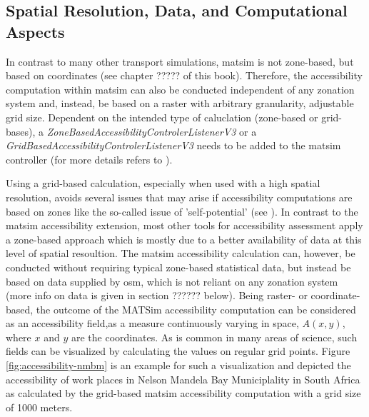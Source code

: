 

\subsection{Spatial Resolution, Data, and Computational Aspects}
In contrast to many other transport simulations, \gls{matsim} is not zone-based, but based on coordinates (see 
chapter ????? of this book).
Therefore, the accessibility computation within \gls{matsim} can also be conducted independent 
of any zonation system and, instead, be based on a raster with arbitrary granularity, \ie adjustable grid
size. Dependent on the intended type of caluclation (zone-based or grid-bases), a 
\textit{ZoneBasedAccessibilityControlerListenerV3} or a \textit{GridBasedAccessibilityControlerListenerV3} needs to be added
to the \gls{matsim} controller (for more details refers to \citet{NicolaiNagel2012HiResAccessibilityMethodInBook}).

Using a grid-based calculation, especially when used with a high spatial resolution, avoids several issues
that may arise if accessibility computations are based on zones like the so-called issue of 'self-potential'
(see \citep[e.g.,][]{NicolaiNagel2012HiResAccessibilityMethodInBook}). In contrast to the \gls{matsim} accessibility
extension, most other tools for accessibility assessment apply a zone-based approach 
\citep{CurtisEtAl2013AccessibilityPolicyInnovation, LiuZhu2004AccessibilityAnalyst, BuettnerEtAl2010Erreichbarkeitsatlas}
which is mostly due to a better availability of data at this level of spatial resoultion. The \gls{matsim} accessibility
calculation can, however, be conducted without requiring typical zone-based statistical data, but instead be based on data 
supplied by \gls{osm}, which is not reliant on any zonation system (more info on data is given in section ?????? 
below).
Being raster- or coordinate-based, the outcome of the MATSim accessibility computation can be considered as an 
accessibility field,\ie as a measure continuously varying in space, $A(x,y)$, where $x$ and $y$ are the coordinates. As 
is common in many areas of science, such fields can be visualized by calculating the values on regular grid points. Figure
\ref{fig:accessibility-nmbm} is an example for such a visualization and depicted the accessibility of work places in 
Nelson Mandela Bay Municiplality in South Africa as calculated by the grid-based \gls{matsim} accessibility computation 
with a grid size of 1000 meters.

